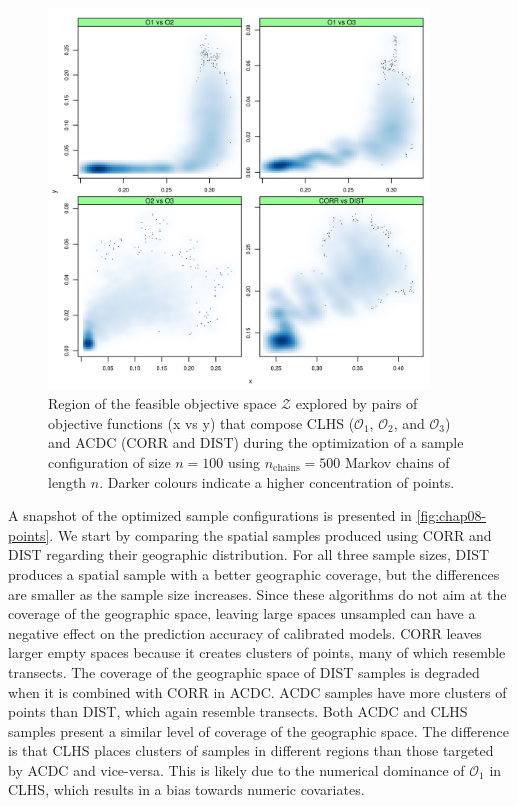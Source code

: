 \begin{figure}[!ht]
 \centering
 \includegraphics[width=0.90\textwidth]{fig/chap08-energy-acdc-clhs}
 \caption[Region of the feasible objective space explored by pairs of objective functions that compose CLHS 
 and ACDC.]{Region of the feasible objective space $\mathcal{Z}$ explored by pairs of objective functions (x 
 vs  y) that compose CLHS ($\mathcal{O}_1$, $\mathcal{O}_2$, and $\mathcal{O}_3$) and ACDC (CORR and DIST)  
 during the optimization of a sample configuration of size $n = 100$ using $n_{\text{chains}} = 500$ Markov 
 chains of length $n$. Darker colours indicate a higher concentration of points.}
 \label{fig:chap08-energy-acdc-clhs}
\end{figure}

A snapshot of the optimized sample configurations is presented in \autoref{fig:chap08-points}. We start by 
comparing the spatial samples produced using CORR and DIST regarding their geographic distribution. For all 
three sample sizes, DIST produces a spatial sample with a better geographic coverage, but the differences are 
smaller as the sample size increases. Since these algorithms do not aim at the coverage of the geographic 
space, leaving large spaces unsampled can have a negative effect on the prediction accuracy of calibrated 
models. CORR leaves larger empty spaces because it creates clusters of points, many of which resemble 
transects. The coverage of the geographic space of DIST samples is degraded when it is combined with CORR in 
ACDC. 
ACDC samples have more clusters of points than DIST, which again resemble transects. Both ACDC and CLHS samples 
present a similar level of coverage of the geographic space. The difference is that CLHS places clusters of 
samples in different regions than those targeted by ACDC and vice-versa. This is likely due to the numerical 
dominance of $\mathcal{O}_1$ in CLHS, which results in a bias towards numeric covariates.

